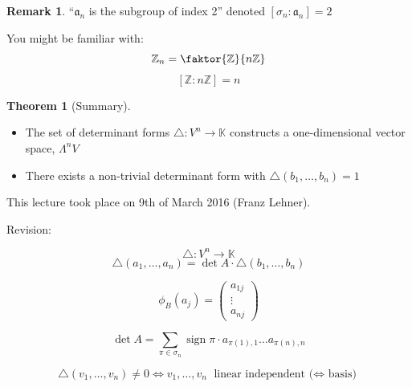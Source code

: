\documentclass[a4paper,landscape,twocolumn]{article}
\newcommand\meta[3]{This #1 took place on #2 (#3).\par}
\theoremstyle{definition}
\newtheorem{theorem}{Theorem}
\newtheorem{rem}{Remark}
\DeclareMathOperator\sign{sign}
\begin{document}
\begin{rem}
  \enquote{$\mathfrak a_n$ is the subgroup of index 2}
  denoted $[\sigma_n: \mathfrak a_n] = 2$

  You might be familiar with:
  \[ \mathbb Z_n = \faktor{\mathbb Z}{n \mathbb Z} \]
  \[ [\mathbb Z : n \mathbb Z] = n \]
\end{rem}

\begin{theorem}[Summary]
  \label{summary-7.24}
  \begin{itemize}
    \item The set of determinant forms $\triangle: V^n \to \mathbb K$
      constructs a one-dimensional vector space, $\Lambda^n V$
    \item There exists a non-trivial determinant form with $\triangle(b_1,\ldots,b_n) = 1$
  \end{itemize}
\end{theorem}

\meta{lecture}{9th of March 2016}{Franz Lehner}

Revision:

\[ \triangle: V^n \to \mathbb K \]
\[ \triangle(a_1, \ldots, a_n) = \det{A} \cdot \triangle(b_1, \ldots, b_n) \]

\[ \phi_B(a_j) = \begin{pmatrix} a_{1j} \\ \vdots \\ a_{nj} \end{pmatrix} \]

\[ \det{A} = \sum_{\pi \in \sigma_n} \sign{\pi} \cdot a_{\pi(1),1} \ldots a_{\pi(n),n} \]

\[ \triangle(v_1, \ldots, v_n) \neq 0 \Leftrightarrow v_1, \ldots, v_n \text{ linear independent ($\Leftrightarrow$ basis)} \]
\end{document}

